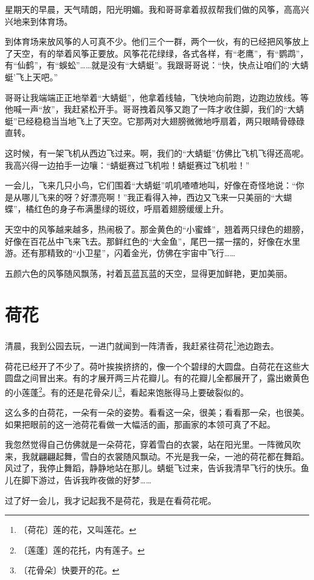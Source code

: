 \documentclass[12pt,UTF-8,openany]{ctexbook}
\begin{document}
\begin{large}
    
    星期天的早晨，天气晴朗，阳光明媚。我和哥哥拿着叔叔帮我们做的风筝，高高兴兴地来到体育场。
    
    到体育场来放风筝的人可真不少。他们三个一群，两个一伙，有的已经把风筝放上了天空，有的举着风筝正要放。风筝花花绿绿，各式各样，有“老鹰”，有“鹦鹉”，有“仙鹤”，有“蜈蚣”……就是没有“大蜻蜓”。我跟哥哥说：“快，快点让咱们的‘大蜻蜓’飞上天吧。”
    
    哥哥让我端端正正地举着“大蜻蜓”，他拿着线轴，飞快地向前跑，边跑边放线。等他喊一声“放”，我赶紧松开手。哥哥拽着风筝又跑了一阵才收住脚，我们的“大蜻蜓”已经稳稳当当地飞上了天空。它那两对大翅膀微微地呼扇着，两只眼睛骨碌碌直转。
    
    这时候，有一架飞机从西边飞过来。啊，我们的“大蜻蜓”仿佛比飞机飞得还高呢。我高兴得一边拍手一边嚷：“蜻蜓赛过飞机啦！蜻蜓赛过飞机啦！”
    
    一会儿，飞来几只小鸟，它们围着“大蜻蜓”叽叽喳喳地叫，好像在奇怪地说：“你是从哪儿飞来的呀？好漂亮啊！”我正看得入神，西边又飞来一只美丽的“大蝴蝶”，橘红色的身子布满墨绿的斑纹，呼扇着翅膀缓缓上升。
    
    天空中的风筝越来越多，热闹极了。那金黄色的“小蜜蜂”，翘着两只绿色的翅膀，好像在百花丛中飞来飞去。那鲜红色的“大金鱼”，尾巴一摆一摆的，好像在水里游。还有那精致的“小卫星”，闪着金光，仿佛在宇宙中飞行……
    
    五颜六色的风筝随风飘荡，衬着瓦蓝瓦蓝的天空，显得更加鲜艳，更加美丽。
    
\end{large}



\chapter{荷花}

\begin{large}
    
    清晨，我到公园去玩，一进门就闻到一阵清香，我赶紧往荷花\footnote{〔荷花〕莲的花，又叫莲花。}池边跑去。
    
    荷花已经开了不少了。荷叶挨挨挤挤的，像一个个碧绿的大圆盘。白荷花在这些大圆盘之间冒出来。有的才展开两三片花瓣儿。有的花瓣儿全都展开了，露出嫩黄色的小莲蓬\footnote{〔莲蓬〕莲的花托，内有莲子。}。有的还是花骨朵儿\footnote{〔花骨朵〕快要开的花。}，看起来饱胀得马上要破裂似的。
    
    这么多的白荷花，一朵有一朵的姿势。看看这一朵，很美；看看那一朵，也很美。如果把眼前的这一池荷花看做一大幅活的画，那画家的本领可真了不起。
    
    我忽然觉得自己仿佛就是一朵荷花，穿着雪白的衣裳，站在阳光里。一阵微风吹来，我就翩翩起舞，雪白的衣裳随风飘动。不光是我一朵，一池的荷花都在舞蹈。风过了，我停止舞蹈，静静地站在那儿。蜻蜓飞过来，告诉我清早飞行的快乐。鱼儿在脚下游过，告诉我昨夜做的好梦……
    
    过了好一会儿，我才记起我不是荷花，我是在看荷花呢。
    
\end{large}
\end{document}
